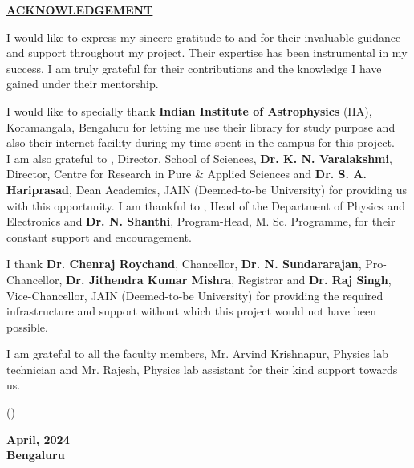 \thispagestyle{empty}

\begin{center}

    \Large{\underline{\textbf{ACKNOWLEDGEMENT}}}\\

\end{center}

\vspace{1cm}

\noindent
I would like to express my sincere gratitude to \textbf{\gnameOne} and \textbf{\gnameTwo} for their invaluable guidance and support throughout my project. Their expertise has been instrumental in my success. I am truly grateful for their contributions and the knowledge I have gained under their mentorship.

\vspace{0.5cm}

\noindent I would like to specially thank \textbf{Indian Institute of Astrophysics} (IIA), Koramangala, Bengaluru for letting me use their library for study purpose and also their internet facility during my time spent in the campus for this project.\\

\noindent
I am also grateful to \textbf{\director}, Director, School of Sciences, \textbf{Dr. K. N. Varalakshmi}, Director, Centre for Research in Pure \& Applied Sciences and \textbf{Dr. S. A. Hariprasad}, Dean Academics, JAIN (Deemed-to-be University) for providing us with this opportunity. I am thankful to \textbf{\hod}, Head of the Department of Physics and Electronics and \textbf{Dr. N. Shanthi}, Program-Head, M. Sc. Programme, for their constant support and encouragement.

\vspace{0.5cm}

\noindent
I thank \textbf{Dr. Chenraj Roychand}, Chancellor, \textbf{Dr. N. Sundararajan}, Pro-Chancellor, \textbf{Dr. Jithendra Kumar Mishra}, Registrar and \textbf{Dr. Raj Singh}, Vice-Chancellor, JAIN (Deemed-to-be University) for providing the required infrastructure and support without which this project would not have been possible.

\vspace{0.5cm}

\noindent
I am grateful to all the faculty members, Mr. Arvind Krishnapur, Physics lab technician and Mr. Rajesh, Physics lab assistant for their kind support towards us.

\vspace{1.5cm}

\noindent
\begin{minipage}{0.5\textwidth}

    (\auth)

\end{minipage}%
\begin{minipage}{0.5\textwidth}
    \flushright

    \textbf{April, 2024\\
        Bengaluru}
\end{minipage}

